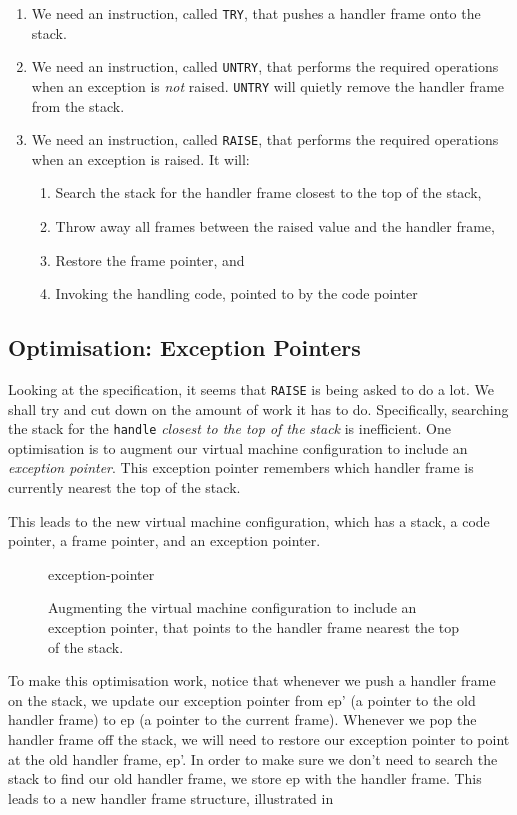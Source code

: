 \begin{enumerate}
    \item We need an instruction, called \texttt{TRY}, that pushes a handler frame onto the stack.
    \item We need an instruction, called \texttt{UNTRY}, that performs the required operations when an exception is \textit{not} raised. \texttt{UNTRY} will quietly remove the handler frame from the stack. 
    \item We need an instruction, called \texttt{RAISE}, that performs the required operations when an exception is raised. It will:
    \begin{enumerate}
        \item Search the stack for the handler frame closest to the top of the stack,
        \item Throw away all frames between the raised value and the handler frame, 
        \item Restore the frame pointer, and
        \item Invoking the handling code, pointed to by the code pointer
    \end{enumerate}
\end{enumerate}
\subsection{Optimisation: Exception Pointers}\label{section:exception-pointers}
Looking at the specification, it seems that \texttt{RAISE} is being asked to do a lot. We shall try and cut down on the amount of work it has to do. Specifically, searching the stack for the \texttt{handle} \textit{closest to the top of the stack} is inefficient. One optimisation is to augment our virtual machine configuration to include an \textit{exception pointer}. This exception pointer remembers which handler frame is currently nearest the top of the stack. 

This leads to the new virtual machine configuration, which has a stack, a code pointer, a frame pointer, and an exception pointer. 

\begin{figure}[H]
    \centering
    {exception-pointer}
    \caption{Augmenting the virtual machine configuration to include an exception pointer, that points to the handler frame nearest the top of the stack.}
    \label{fig:exception-pointer}
\end{figure}

To make this optimisation work, notice that whenever we push a handler frame on the stack, we update our exception pointer from ep' (a pointer to the old handler frame) to ep (a pointer to the current frame). Whenever we pop the handler frame off the stack, we will need to restore our exception pointer to point at the old handler frame, ep'. In order to make sure we don't need to search the stack to find our old handler frame, we store ep with the handler frame. This leads to a new handler frame structure, illustrated in 

